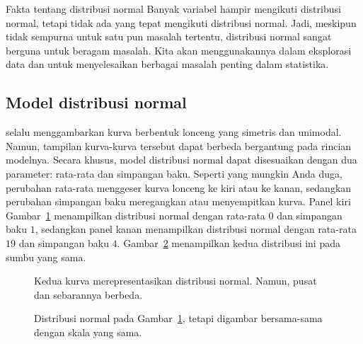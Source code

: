 \begin{onebox}{Fakta tentang distribusi normal}
  Banyak variabel hampir mengikuti distribusi normal, tetapi tidak ada
  yang tepat mengikuti distribusi normal.
  Jadi, meskipun tidak sempurna untuk satu pun masalah tertentu,
  distribusi normal sangat berguna untuk beragam masalah.
  Kita akan menggunakannya dalam eksplorasi data dan untuk menyelesaikan
  berbagai masalah penting dalam statistika.
\end{onebox}


\subsection{Model distribusi normal}

 selalu menggambarkan
kurva berbentuk lonceng yang simetris dan unimodal.
Namun, tampilan kurva-kurva tersebut dapat berbeda bergantung pada
rincian modelnya.
Secara khusus, model distribusi normal dapat disesuaikan dengan
dua parameter: rata-rata dan simpangan baku.
Seperti yang mungkin Anda duga, perubahan rata-rata menggeser
kurva lonceng ke kiri atau ke kanan, sedangkan perubahan simpangan baku
meregangkan atau menyempitkan kurva.
Panel kiri Gambar~\ref{twoSampleNormals} menampilkan distribusi normal
dengan rata-rata $0$ dan simpangan baku $1$, sedangkan panel kanan
menampilkan distribusi normal dengan rata-rata $19$ dan simpangan baku $4$.
Gambar~\ref{twoSampleNormalsStacked} menampilkan kedua distribusi ini
pada sumbu yang sama.

\begin{figure}[h]
  \centering
  \caption{Kedua kurva merepresentasikan distribusi normal.
      Namun, pusat dan sebarannya berbeda.}
  \label{twoSampleNormals}
\end{figure}

\begin{figure}[h]
  \centering
  \caption{Distribusi normal pada
      Gambar~\ref{twoSampleNormals}, tetapi digambar bersama-sama
      dengan skala yang sama.}
  \label{twoSampleNormalsStacked}
\end{figure}


